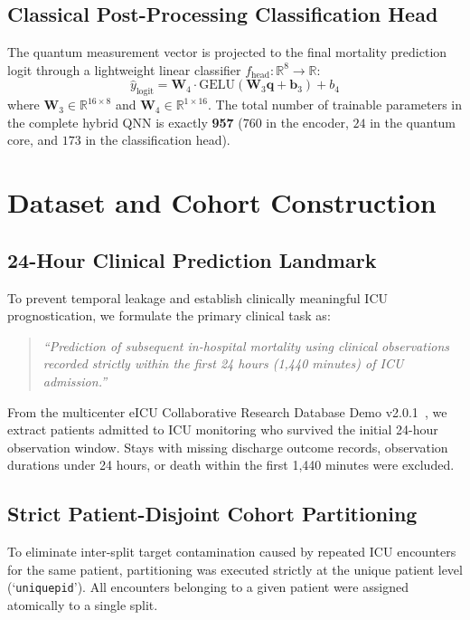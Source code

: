 \documentclass[conference]{IEEEtran}
\begin{document}
\subsection{Classical Post-Processing Classification Head}
The quantum measurement vector is projected to the final mortality prediction logit through a lightweight linear classifier $f_{\text{head}}: \mathbb{R}^8 \to \mathbb{R}$:
\begin{equation}
    \hat{y}_{\text{logit}} = \mathbf{W}_4 \cdot \text{GELU}(\mathbf{W}_3 \mathbf{q} + \mathbf{b}_3) + b_4
\end{equation}
where $\mathbf{W}_3 \in \mathbb{R}^{16 \times 8}$ and $\mathbf{W}_4 \in \mathbb{R}^{1 \times 16}$. The total number of trainable parameters in the complete hybrid QNN is exactly \textbf{957} ($760$ in the encoder, $24$ in the quantum core, and $173$ in the classification head).

\section{Dataset and Cohort Construction}
\subsection{24-Hour Clinical Prediction Landmark}
To prevent temporal leakage and establish clinically meaningful ICU prognostication, we formulate the primary clinical task as:
\begin{quote}
\textit{``Prediction of subsequent in-hospital mortality using clinical observations recorded strictly within the first 24 hours (1,440 minutes) of ICU admission.''}
\end{quote}
From the multicenter eICU Collaborative Research Database Demo v2.0.1~\cite{pollard2018eicu}, we extract patients admitted to ICU monitoring who survived the initial 24-hour observation window. Stays with missing discharge outcome records, observation durations under 24 hours, or death within the first 1,440 minutes were excluded.

\subsection{Strict Patient-Disjoint Cohort Partitioning}
To eliminate inter-split target contamination caused by repeated ICU encounters for the same patient, partitioning was executed strictly at the unique patient level (`\texttt{uniquepid}'). All encounters belonging to a given patient were assigned atomically to a single split.
\end{document}
